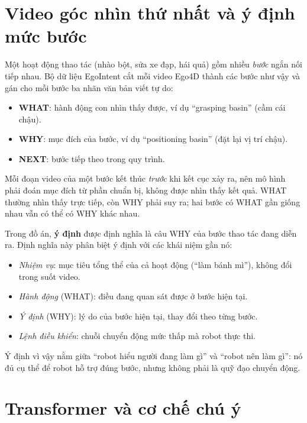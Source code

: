 \documentclass[a4paper,oneside]{report}
\begin{document}
\section{Video góc nhìn thứ nhất và ý định mức bước}
\label{sec:egointent_theory}

Một hoạt động thao tác (nhào bột, sửa xe đạp, hái quả) gồm nhiều \textit{bước} ngắn nối tiếp nhau. Bộ dữ liệu EgoIntent \citep{egointent2026} cắt mỗi video Ego4D \citep{grauman2022ego4d} thành các bước như vậy và gán cho mỗi bước ba nhãn văn bản viết tự do:
\begin{itemize}
  \item \textbf{WHAT}: hành động con nhìn thấy được, ví dụ ``grasping basin'' (cầm cái chậu).
  \item \textbf{WHY}: mục đích của bước, ví dụ ``positioning basin'' (đặt lại vị trí chậu).
  \item \textbf{NEXT}: bước tiếp theo trong quy trình.
\end{itemize}
Mỗi đoạn video của một bước kết thúc \textit{trước} khi kết cục xảy ra, nên mô hình phải đoán mục đích từ phần chuẩn bị, không được nhìn thấy kết quả. WHAT thường nhìn thấy trực tiếp, còn WHY phải suy ra; hai bước có WHAT gần giống nhau vẫn có thể có WHY khác nhau.

Trong đồ án, \textbf{ý định} được định nghĩa là câu WHY của bước thao tác đang diễn ra. Định nghĩa này phân biệt ý định với các khái niệm gần nó:
\begin{itemize}
  \item \textit{Nhiệm vụ}: mục tiêu tổng thể của cả hoạt động (``làm bánh mì''), không đổi trong suốt video.
  \item \textit{Hành động} (WHAT): điều đang quan sát được ở bước hiện tại.
  \item \textit{Ý định} (WHY): lý do của bước hiện tại, thay đổi theo từng bước.
  \item \textit{Lệnh điều khiển}: chuỗi chuyển động mức thấp mà robot thực thi.
\end{itemize}
Ý định vì vậy nằm giữa ``robot hiểu người đang làm gì'' và ``robot nên làm gì'': nó đủ cụ thể để robot hỗ trợ đúng bước, nhưng không phải là quỹ đạo chuyển động.

\section{Transformer và cơ chế chú ý}
\label{sec:transformer}
\end{document}
